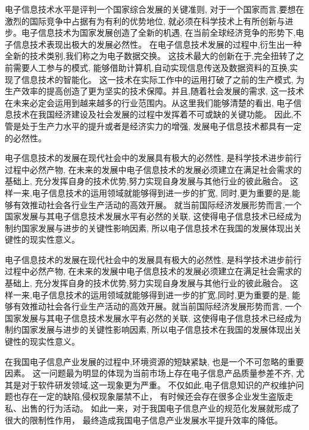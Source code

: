\documentclass[10pt, conference, compsocconf, a4paper]{IEEEtran}
\begin{document}
电子信息技术水平是评判一个国家综合发展的关键准则,
对于一个国家而言,要想在激烈的国际竞争中占据有为有利的优势地位,
就必须在科学技术上有所创新与进步。电子信息技术为国家发展创造了全新的机遇,
在当前全球经济竞争的形势下,电子信息技术表现出极大的发展必然性。
在电子信息技术发展的过程中,衍生出一种全新的技术类别,我们称之为电子数据交换。
这技术最大的创新在于,完全扭转了之前需要人工参与的模式,
能够借助计算机,自动实现信息传送及数据资料的互换,实现了信息技术的智能化。
这一技术在实际工作中的运用打破了之前的生产模式,
为生产效率的提高创造了更为坚实的技术保障。并且,随着社会发展的需求,
这一技术在未来必定会运用到越来越多的行业范围内。从这里我们能够清楚的看出,
电子信息技术在我国经济建设及社会发展的过程中发挥着不可或缺的关键功能。
因此,不管是处于生产力水平的提升或者是经济实力的增强,
发展电子信息技术都具有一定的必然性。\par

电子信息技术的发展在现代社会中的发展具有极大的必然性,
是科学技术进步前行过程中必然产物,
在未来的发展中电子信息技术的发展必须建立在满足社会需求的基础上,
充分发挥自身的技术优势,努力实现自身发展与其他行业的彼此融合。
这样一来,电子信息技术的运用领域就能够得到进一步的扩宽,
同时,更为重要的是,能够有效推动社会各行业生产活动的高效开展。
就当前国际经济发展形势而言,一个国家发展与其电子信息技术发展水平有必然的关联,
这使得电子信息技术已经成为制约国家发展与进步的关键性影响因素,
所以电子信息技术在我国的发展体现出关键性的现实性意义。\par

电子信息技术的发展在现代社会中的发展具有极大的必然性,
是科学技术进步前行过程中必然产物,
在未来的发展中电子信息技术的发展必须建立在满足社会需求的基础上,
充分发挥自身的技术优势,努力实现自身发展与其他行业的彼此融合。
这样一来,电子信息技术的运用领域就能够得到进一步的扩宽,同时,更为重要的是,
能够有效推动社会各行业生产活动的高效开展。就当前国际经济发展形势而言,
一个国家发展与其电子信息技术发展水平有必然的关联,
这使得电子信息技术已经成为制约国家发展与进步的关键性影响因素,
所以电子信息技术在我国的发展体现出关键性的现实性意义。\par


在我国电子信息产业发展的过程中,环境资源的短缺紧缺,
也是一个不可忽略的重要因素。
这一问题最为明显的体现为当前市场上存在电子信息产品质量参差不齐,
尤其是对于软件研发领域,这一现象更为严重。
不仅如此,电子信息知识的产权维护问题也存在一定的缺陷,侵权现象屡禁不止，
有时候还会存在很多企业发生盗版走私、出售的行为活动。
如此一来，对于我国电子信息产业的规范化发展就形成了很大的限制性作用，
最终造成我国电子信息产业发展水平提升效率的降低。\par
\end{document}
